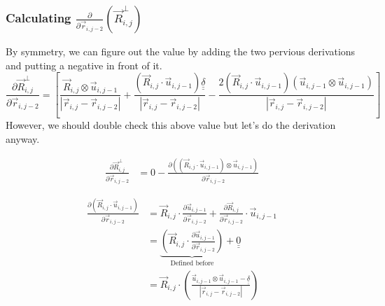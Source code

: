 \documentclass{article}
\renewcommand{\ij}{_{i,j}}
\newcommand{\ijj}{_{i,j-1}}
\newcommand{\ijk}{_{i,j-2}}
\newcommand{\ijjj}{_{i,j-2}}
\newcommand{\magn}[1]{\left\vert #1 \right\vert }
\renewcommand{\part}[2]{\frac{\partial #1 }{\partial #2}}
\newcommand{\partbig}[2]{\frac{\partial }{\partial #2}\left( #1 \right)}
\newcommand{\ten}[1]{\underline{\underline{#1}}}
\newcommand{\rij}{\vec{r} \ij}
\newcommand{\Rij}{\vec{R} \ij}
\newcommand{\rijjj}{\vec{r} \ijjj}
\newcommand{\uijj}{\vec{u} \ijj}
\begin{document}
\subsubsection{Calculating $\displaystyle\partbig{\Rij^\perp}{\rijjj}$}
By symmetry, we can figure out the value by adding the two pervious derivations
and putting a negative in front of it. 
\begin{equation}
  \label{eqn:dRijPerpdrijjj}
  \part{\vec{R}\ij ^ \bot}{\vec{r}\ijk}  =  
  \left[
  \frac{\Rij \otimes \uijj }{\magn{\rij - \rijjj}} 
  +
  \frac{ \left( 
    \Rij \cdot \uijj
    \right) \ten{\delta}}{\magn{\rij - \rijjj}}
  -
  \frac{
    2 \left(
      \Rij \cdot \uijj 
    \right)
    \left(\uijj \otimes \uijj 
    \right)
    }{\magn{\rij - \rijjj}}
  \right]
\end{equation}
However, we should double check this above value but let's do the derivation
anyway.

\begin{align*}
  \part{\vec{R}\ij ^ \bot}{\vec{r}\ijk}  &=  
  0
  - \part{\left(\left(\vec{R}\ij \cdot \vec{u} \ijj \right) \otimes 
  \vec{u} \ijj \right)
  }{\vec{r}\ijjj}
\end{align*}


\begin{align*}
  \part{\left(\vec{R}\ij \cdot \vec{u} \ijj \right)}{\vec{r}\ijk}   
  &= 
  \vec{R}\ij \cdot \part{\vec{u} \ijj}{\vec{r} \ijjj} + 
  \part{\vec{R} \ij}{\vec{r} \ijjj} \cdot \vec{u}\ijj
  \\
  &= 
  \underbrace{
  \left(
  \Rij \cdot  \part{\uijj}{\rijjj} 
  \right)}_{\text{Defined before}}
  +
  \ten{0} 
  \\
  &=
  \Rij \cdot 
  \left(
    \frac{\uijj \otimes \uijj - \ten{\delta}}{\magn{\rij - \rijjj}}
  \right)
\end{align*}
\end{document}
